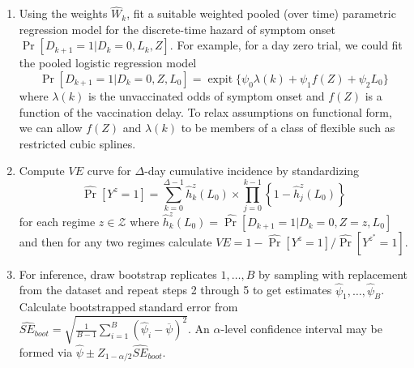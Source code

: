 \begin{appendices}
\begin{refsection}
\begin{enumerate}
        \item Using the weights $\widehat{W}_k$, fit a suitable weighted pooled (over time) parametric regression model for the discrete-time hazard of symptom onset $\Pr[D_{k+1} = 1 | D_k = 0, L_k, Z]$. For example, for a day zero trial, we could fit the pooled logistic regression model
        \begin{equation*}
            \Pr[D_{k+1} = 1 | D_k = 0, Z, L_0] =  \operatorname{expit}\{\psi_0 \lambda(k) + \psi_1f(Z) + \psi_2 L_0\}
        \end{equation*} 
        where $\lambda(k)$ is the unvaccinated odds of symptom onset and $f(Z)$ is a function of the vaccination delay. To relax assumptions on functional form, we can allow $f(Z)$ and $\lambda(k)$ to be members of a class of flexible such as restricted cubic splines.
        \item Compute $VE$ curve for $\Delta$-day cumulative incidence by standardizing  
        \begin{equation*}
            \widehat{\Pr}[Y^z = 1] = \sum_{k = 0}^{\Delta - 1} \widehat{h}_k^z(L_0) \times \prod_{j = 0}^{k-1} \left\{1 - \widehat{h}_j^z(L_0)\right\}
        \end{equation*}
        for each regime $z \in \mathcal{Z}$ where $\widehat{h}_k^z(L_0) = \widehat{\Pr}[D_{k+1} = 1 | D_k = 0, Z = z, L_0]$ and then for any two regimes calculate $VE = 1 - \widehat{\Pr}[Y^z = 1]/\widehat{\Pr}[Y^{z^*} = 1]$.
        \item For inference, draw bootstrap replicates $1, \ldots, B$ by sampling with replacement from the dataset and repeat steps 2 through 5 to get estimates $\widehat{\psi}_1, \ldots, \widehat{\psi}_B$. Calculate bootstrapped standard error from $\widehat{SE}_{boot} = \sqrt{\frac{1}{B-1} \sum_{i=1}^{B} (\widehat{\psi}_i - \overline{\psi})^2}$. An $\alpha$-level confidence interval may be formed via $\widehat{\psi} \pm Z_{1-\alpha/2} \widehat{SE}_{boot}$.
    \end{enumerate} 
    \clearpage

\end{refsection}
\end{appendices}

